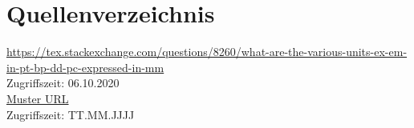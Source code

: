 \newpage
{}
\section{Quellenverzeichnis}

{\url{https://tex.stackexchange.com/questions/8260/what-are-the-various-units-ex-em-in-pt-bp-dd-pc-expressed-in-mm}} \\
Zugriffszeit: 06.10.2020\\

{\url{Muster URL}} \\
Zugriffszeit: TT.MM.JJJJ\\
